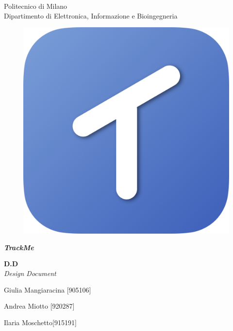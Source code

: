 \thispagestyle{empty}

\begin{center}

	\Huge Politecnico di Milano  \\   	\vspace{14pt}
    \Large Dipartimento di Elettronica, Informazione e Bioingegneria
    
    \vspace{30pt}
    
      \begin{figure}[h]
      	\centering
        \includegraphics[scale=0.25]{Pictures/Icon.png}
      \end{figure}
    
    \vspace{25pt}
    
    \Huge \textbf{\emph{TrackMe}} 
    \\
    \vspace{12pt}
    
   
    \huge \textbf{D.D} \\
    \vspace{7pt}
    \Large \emph{Design Document} \\
    
    \vspace{110pt}
    
    \large Giulia Mangiaracina [905106]\\
    
    \vspace{5pt}
    
    \large Andrea Miotto [920287]\\
    
    \vspace{5pt}
    
    \large Ilaria Moschetto[915191]
    
    
\end{center}